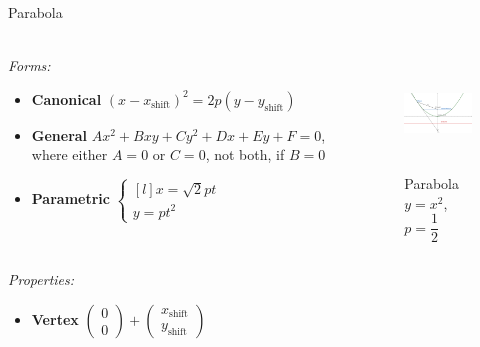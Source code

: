 \documentclass[aspectratio=169]{beamer}
\newcommand{\shf}{\text{shift}}
\begin{document}
\begin{frame}[t]{Parabola}
    \framesubtitle{}
        \scriptsize
        \vspace{-0.4cm}
    \begin{columns}[T,onlytextwidth]
        \begin{column}{0.59\textwidth}
            \textit{Forms:} \\
    \begin{itemize}
        \item \textbf{Canonical} $(x-x_{\shf})^2=2p(y-y_{\shf})$
        \item \textbf{General} $Ax^2+Bxy+Cy^2+Dx+Ey+F=0$, where either $A=0$ or $C=0$, not both, if $B=0$
        \item \textbf{Parametric} $\left\{\begin{matrix*}[l] x = \sqrt{2}pt\\ y = pt^2\end{matrix*}\right.$
    \end{itemize}
        \end{column}
        \begin{column}{0.39\textwidth}
            \begin{figure}[H]
                \centering\includegraphics[height=3cm,width=1\textwidth,keepaspectratio]{Parabola.png}
                \vspace{-0.5cm}
                \caption*{\scriptsize Parabola $y=x^2$, $p=\dfrac{1}{2}$}
                \label{fig:Parabola.png}
            \end{figure}
        \end{column}
    \end{columns}
    \vspace{-0.6cm}
    \textit{Properties:}
    \begin{multicols}{3}
        \begin{itemize}
            \item \textbf{Vertex} $\begin{pmatrix} 0\\0 \end{pmatrix} + \begin{pmatrix} x_{\shf}\\y_{\shf} \end{pmatrix}$

\end{itemize}
\end{multicols}
\end{frame}
\end{document}
